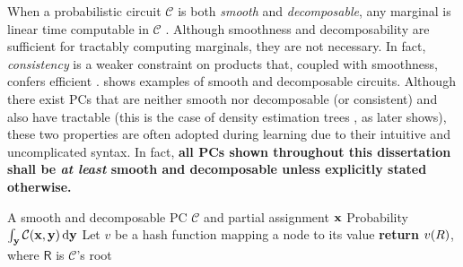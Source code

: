 When a probabilistic circuit $\mathcal{C}$ is both \emph{smooth} and \emph{decomposable}, any
marginal is linear time computable in $\mathcal{C}$ \citep{poon11,peharz15}. Although smoothness
and decomposability are sufficient for tractably computing marginals, they are not necessary. In
fact, \emph{consistency} is a weaker constraint on products that, coupled with smoothness, confers
efficient \mar{} \citep{poon11}.  shows examples of smooth and decomposable
circuits. Although there exist PCs that are neither smooth nor decomposable (or consistent) and
also have tractable \mar{} (this is the case of density estimation trees \citep{ram11}, as
 later shows), these two properties are often adopted during learning due to their
intuitive and uncomplicated syntax. In fact, \textbf{all PCs shown throughout this dissertation
shall be \emph{at least} smooth and decomposable unless explicitly stated otherwise.}

\begin{algorithm}[t]
  \caption{\mar}\label{alg:mar}
  \begin{algorithmic}[1]
    \Require A smooth and decomposable PC $\mathcal{C}$ and partial assignment $\mathbf{x}$
    \Ensure Probability $\int_{\mathbf{y}}\mathcal{C}(\mathbf{x},\mathbf{y})\mathop{}\!\mathrm{d}\mathbf{y}$
    \State Let $v$ be a hash function mapping a node to its value
    \EndFor%
    \State \textbf{return} $v(\normalfont{R})$, where $\textsf{R}$ is $\mathcal{C}$'s root
  \end{algorithmic}
\end{algorithm}

